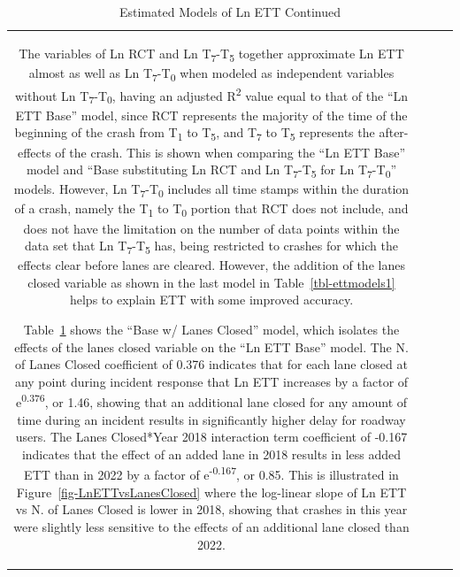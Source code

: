 \documentclass[
  letterpaper,
  authoryear]{elsarticle}
\begin{document}
\begin{table}
{\begin{tabular}[t]{c|c|c|c}
\begin{table}
The variables of Ln RCT and Ln T\textsubscript{7}-T\textsubscript{5}
together approximate Ln ETT almost as well as Ln
T\textsubscript{7}-T\textsubscript{0} when modeled as independent
variables without Ln T\textsubscript{7}-T\textsubscript{0}, having an
adjusted R\textsuperscript{2} value equal to that of the ``Ln ETT Base''
model, since RCT represents the majority of the time of the beginning of
the crash from T\textsubscript{1} to T\textsubscript{5}, and
T\textsubscript{7} to T\textsubscript{5} represents the after-effects of
the crash. This is shown when comparing the ``Ln ETT Base'' model and
``Base substituting Ln RCT and Ln T\textsubscript{7}-T\textsubscript{5}
for Ln T\textsubscript{7}-T\textsubscript{0}'' models. However, Ln
T\textsubscript{7}-T\textsubscript{0} includes all time stamps within
the duration of a crash, namely the T\textsubscript{1} to
T\textsubscript{0} portion that RCT does not include, and does not have
the limitation on the number of data points within the data set that Ln
T\textsubscript{7}-T\textsubscript{5} has, being restricted to crashes
for which the effects clear before lanes are cleared. However, the
addition of the lanes closed variable as shown in the last model in
Table~\ref{tbl-ettmodels1} helps to explain ETT with some improved
accuracy.

Table~\ref{tbl-ettmodels2} shows the ``Base w/ Lanes Closed'' model,
which isolates the effects of the lanes closed variable on the ``Ln ETT
Base'' model. The N. of Lanes Closed coefficient of 0.376 indicates that
for each lane closed at any point during incident response that Ln ETT
increases by a factor of e\textsuperscript{0.376}, or 1.46, showing that
an additional lane closed for any amount of time during an incident
results in significantly higher delay for roadway users. The Lanes
Closed*Year 2018 interaction term coefficient of -0.167 indicates that
the effect of an added lane in 2018 results in less added ETT than in
2022 by a factor of e\textsuperscript{-0.167}, or 0.85. This is
illustrated in Figure~\ref{fig-LnETTvsLanesClosed} where the log-linear
slope of Ln ETT vs N. of Lanes Closed is lower in 2018, showing that
crashes in this year were slightly less sensitive to the effects of an
additional lane closed than 2022.

\begin{table}

\caption{\label{tbl-ettmodels2}Estimated Models of Ln ETT Continued}

\centering{

}
\end{table}
\end{table}
\end{tabular}}
\end{table}
\end{document}
